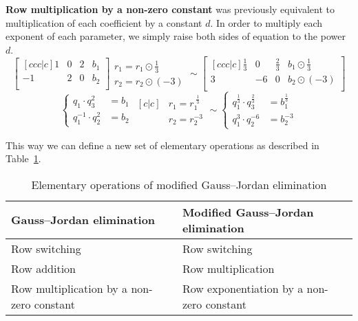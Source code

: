 \textbf{Row multiplication by a non-zero constant} was previously equivalent to multiplication of each coefficient by a constant $d$.
In order to multiply each exponent of each parameter, we simply raise both sides of equation to the power $d$.
\begin{equation}
    \begin{bmatrix}[ccc|c]
        1 & 0 & 2 & b_1 \\
        -1 & 2 & 0 & b_2 \\
    \end{bmatrix}
    \begin{matrix}
        r_1 = r_1\odot \frac{1}{3} \\
        r_2 = r_2\odot (-3)
    \end{matrix}
    \sim
    \begin{bmatrix}[ccc|c]
        \frac{1}{3} & 0 & \frac{2}{3} & b_1 \odot \frac{1}{3} \\
        3 & -6 & 0 & b_2 \odot (-3) \\
    \end{bmatrix}
\end{equation}
\begin{equation}
    \begin{cases}
        q_1 \cdot q_3^2 &= b_1 \\
        q_1^{-1} \cdot q_2^{2} &= b_2
    \end{cases}
    \begin{matrix}[c|c]
        & r_1 = r_1 ^ {\;\frac{1}{3}} \\
        & r_2 = r_2 ^ {-3}
    \end{matrix}
    \sim
    \begin{cases}
        q_1^{\frac{1}{3}} \cdot q_3^{\frac{2}{3}} &= b_1^{\frac{1}{3}} \\
        q_1^{3} \cdot q_2^{-6} &= b_2^{-3}
    \end{cases}
\end{equation}

This way we can define a new set of elementary operations as described in Table~\ref{tab:modified_elementary}.
\begin{table}[h!]
\begin{center}
\begin{tabular}{|l|p{7cm}|}
    \hline
    Gauss--Jordan elimination & Modified Gauss--Jordan elimination \\\hline\hline
    Row switching & Row switching \\\hline
    Row addition & Row multiplication \\\hline
    Row multiplication by a non-zero constant & Row exponentiation by a non-zero constant \\\hline
\end{tabular}
	    \caption{Elementary operations of modified Gauss--Jordan elimination}
		\label{tab:modified_elementary}
\end{center}
\end{table}
